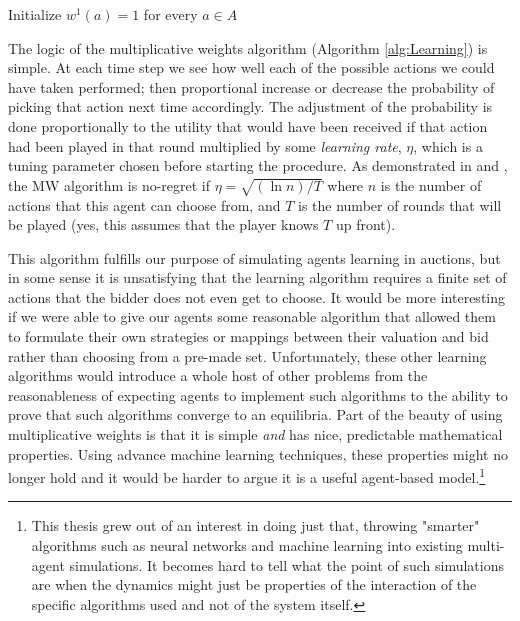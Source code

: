 \documentclass[12pt,twoside]{reedthesis}
\begin{document}
\begin{algorithm}[H]
	Initialize $w^1(a) = 1$ for every $a\in A$\\
\label{alg:Learning}
\end{algorithm}
\vspace{1cm}
The logic of the multiplicative weights algorithm (Algorithm \ref{alg:Learning}) is simple. At each time step we see how well each of the possible actions we could have taken performed; then proportional increase or decrease the probability of picking that action next time accordingly. The adjustment of the probability is done proportionally to the utility that would have been received if that action had been played in that round multiplied by some \textit{learning rate}, $\eta$, which is a tuning parameter chosen before starting the procedure. As demonstrated in \cite{Roughgarden2016} and \cite{Blum2007}, the MW algorithm is no-regret if $\eta = \sqrt{(\ln n) / T}$ where $n$ is the number of actions that this agent can choose from, and $T$ is the number of rounds that will be played (yes, this assumes that the player knows $T$ up front).

This algorithm fulfills our purpose of simulating agents learning in auctions, but in some sense it is unsatisfying that the learning algorithm requires a finite set of actions that the bidder does not even get to choose. It would be more interesting if we were able to give our agents some reasonable algorithm that allowed them to formulate their own strategies or mappings between their valuation and bid rather than choosing from a pre-made set. Unfortunately, these other learning algorithms would introduce a whole host of other problems from the reasonableness of expecting agents to implement such algorithms to the ability to prove that such algorithms converge to an equilibria. Part of the beauty of using multiplicative weights is that it is simple {\em and} has nice, predictable mathematical properties. Using advance machine learning techniques, these properties might no longer hold and it would be harder to argue it is a useful agent-based model.\footnote{This thesis grew out of an interest in doing just that, throwing "smarter" algorithms such as neural networks and machine learning into existing multi-agent simulations. It becomes hard to tell what the point of such simulations are when the dynamics might just be properties of the interaction of the specific algorithms used and not of the system itself.}
\end{document}
